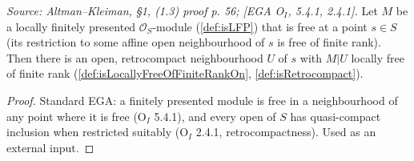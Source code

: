 \begin{theorem}
  \label{thm:ega_lfp_free_at_point}
  \textit{Source: Altman--Kleiman, §1, (1.3) proof p. 56; [EGA O$_I$, 5.4.1, 2.4.1].}
  Let $M$ be a locally finitely presented $\mathcal{O}_S$-module (\cref{def:isLFP})
  that is free at a point $s \in S$ (its restriction to some affine open
  neighbourhood of $s$ is free of finite rank). Then there is an open, retrocompact
  neighbourhood $U$ of $s$ with $M|U$ locally free of finite rank
  (\cref{def:isLocallyFreeOfFiniteRankOn}, \cref{def:isRetrocompact}).
  \begin{proof}
    Standard EGA: a finitely presented module is free in a neighbourhood of any
    point where it is free (O$_I$ 5.4.1), and every open of $S$ has quasi-compact
    inclusion when restricted suitably (O$_I$ 2.4.1, retrocompactness). Used as an
    external input.
  \end{proof}
\end{theorem}

